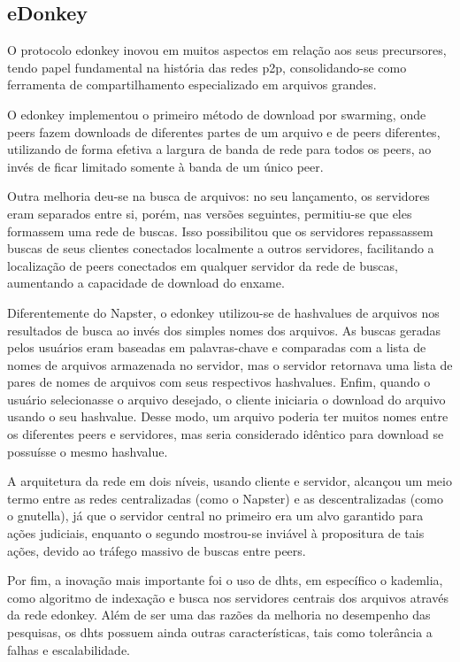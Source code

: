 \subsection{eDonkey}

O protocolo \gls{edonkey} inovou em muitos aspectos em relação aos seus precursores,
tendo papel fundamental na história das redes \gls*{p2p}, consolidando-se como
ferramenta de compartilhamento especializado em arquivos grandes.

O \gls*{edonkey} implementou o primeiro método de download por \gls{swarming}, onde
\glspl*{peer} fazem downloads de diferentes partes de um arquivo e de \glspl*{peer}
diferentes, utilizando de forma efetiva a largura de banda de rede para todos os
\glspl*{peer}, ao invés de ficar limitado somente à banda de um único \gls*{peer}.

Outra melhoria deu-se na busca de arquivos: no seu lançamento, os servidores eram
separados entre si, porém, nas versões seguintes, permitiu-se que eles formassem uma
rede de buscas. Isso possibilitou que os servidores repassassem buscas de seus clientes
conectados localmente a outros servidores, facilitando a localização de \glspl*{peer}
conectados em qualquer servidor da rede de buscas, aumentando a capacidade de download
do enxame.

Diferentemente do Napster, o \gls*{edonkey} utilizou-se de \glspl{hashvalue} de arquivos
nos resultados de busca ao invés dos simples nomes dos arquivos. As buscas geradas
pelos usuários eram baseadas em palavras-chave e comparadas com a lista de nomes de
arquivos armazenada no servidor, mas o servidor retornava uma lista de pares de nomes
de arquivos com seus respectivos \glspl*{hashvalue}. Enfim, quando o usuário
selecionasse o arquivo desejado, o cliente iniciaria o download do arquivo usando o seu
\gls*{hashvalue}. Desse modo, um arquivo poderia ter muitos nomes entre os diferentes
\glspl*{peer} e servidores, mas seria considerado idêntico para download se possuísse o
mesmo \gls*{hashvalue}.

A arquitetura da rede em dois níveis, usando cliente e servidor, alcançou um meio termo
entre as redes centralizadas (como o Napster) e as descentralizadas (como o
\gls*{gnutella}), já que o servidor central no primeiro era um alvo garantido para ações
judiciais, enquanto o segundo mostrou-se inviável à propositura de tais ações, devido
ao tráfego massivo de buscas entre \glspl*{peer}.

Por fim, a inovação mais importante foi o uso de \glspl{dht}, em específico o
\gls{kademlia}, como algoritmo de indexação e busca nos servidores centrais dos
arquivos através da rede \gls*{edonkey}. Além de ser uma das razões da melhoria no
desempenho das pesquisas, os \glspl*{dht} possuem ainda outras características, tais
como tolerância a falhas e escalabilidade.

